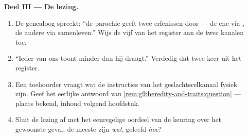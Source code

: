 \begin{problem}
\medskip\noindent\textbf{Deel III --- De lezing.}
\begin{enumerate}[resume]
  \item De genealoog spreekt: ``de parochie geeft twee erfenissen
        door --- de ene via , de andere via
        samenleven.'' Wijs de vijf  van het register
        aan de twee kanalen toe.
  \item ``Ieder van ons toont minder dan hij draagt.''
        Verdedig dat twee keer uit het register.
  \item Een toehoorder vraagt wat de instructies van het
        geslachtscelkanaal fysiek zijn. Geef het eerlijke
        antwoord van \cref{rem:g9:heredity-and-traits:question}
        --- plaats bekend, inhoud volgend hoofdstuk.
  \item Sluit de lezing af met het eenregelige oordeel van de
        keuring over het gewoonste geval: de meeste 
        zijn \emph{wat}, geleefd \emph{hoe}?
\end{enumerate}
\end{problem}
